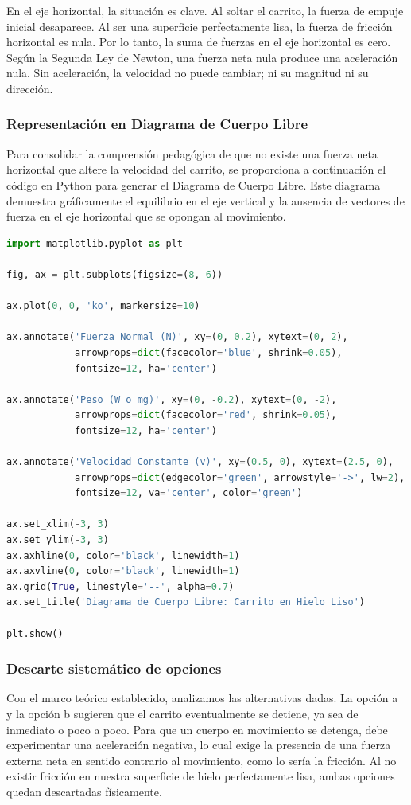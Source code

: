 \documentclass[12pt, a4paper]{article}
\begin{document}
En el eje horizontal, la situación es clave. Al soltar el carrito, la fuerza de empuje inicial desaparece. Al ser una superficie perfectamente lisa, la fuerza de fricción horizontal es nula. Por lo tanto, la suma de fuerzas en el eje horizontal es cero. Según la Segunda Ley de Newton, una fuerza neta nula produce una aceleración nula. Sin aceleración, la velocidad no puede cambiar; ni su magnitud ni su dirección.

\subsubsection*{Representación en Diagrama de Cuerpo Libre}
Para consolidar la comprensión pedagógica de que no existe una fuerza neta horizontal que altere la velocidad del carrito, se proporciona a continuación el código en Python para generar el Diagrama de Cuerpo Libre. Este diagrama demuestra gráficamente el equilibrio en el eje vertical y la ausencia de vectores de fuerza en el eje horizontal que se opongan al movimiento.

\begin{lstlisting}[language=Python]
import matplotlib.pyplot as plt

fig, ax = plt.subplots(figsize=(8, 6))

ax.plot(0, 0, 'ko', markersize=10)

ax.annotate('Fuerza Normal (N)', xy=(0, 0.2), xytext=(0, 2),
            arrowprops=dict(facecolor='blue', shrink=0.05),
            fontsize=12, ha='center')

ax.annotate('Peso (W o mg)', xy=(0, -0.2), xytext=(0, -2),
            arrowprops=dict(facecolor='red', shrink=0.05),
            fontsize=12, ha='center')

ax.annotate('Velocidad Constante (v)', xy=(0.5, 0), xytext=(2.5, 0),
            arrowprops=dict(edgecolor='green', arrowstyle='->', lw=2),
            fontsize=12, va='center', color='green')

ax.set_xlim(-3, 3)
ax.set_ylim(-3, 3)
ax.axhline(0, color='black', linewidth=1)
ax.axvline(0, color='black', linewidth=1)
ax.grid(True, linestyle='--', alpha=0.7)
ax.set_title('Diagrama de Cuerpo Libre: Carrito en Hielo Liso')

plt.show()
\end{lstlisting}

\subsubsection*{Descarte sistemático de opciones}
Con el marco teórico establecido, analizamos las alternativas dadas.
La opción a y la opción b sugieren que el carrito eventualmente se detiene, ya sea de inmediato o poco a poco. Para que un cuerpo en movimiento se detenga, debe experimentar una aceleración negativa, lo cual exige la presencia de una fuerza externa neta en sentido contrario al movimiento, como lo sería la fricción. Al no existir fricción en nuestra superficie de hielo perfectamente lisa, ambas opciones quedan descartadas físicamente.
\end{document}
